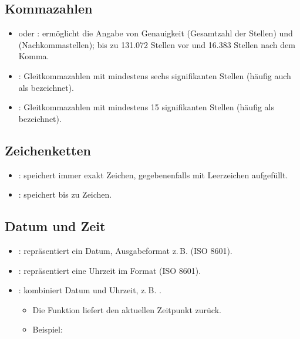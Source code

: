 \subsection{Kommazahlen}
    \begin{itemize}
        \item \textbf{} oder \textbf{}: 
        ermöglicht die Angabe von Genauigkeit  (Gesamtzahl der Stellen) 
        und  (Nachkommastellen); 
        bis zu 131.072 Stellen vor und 16.383 Stellen nach dem Komma.
        \item \textbf{}: Gleitkommazahlen mit mindestens sechs signifikanten Stellen 
        (häufig auch als  bezeichnet).
        \item \textbf{}: Gleitkommazahlen mit mindestens 15 signifikanten Stellen 
        (häufig als  bezeichnet).
    \end{itemize}

    \subsection{Zeichenketten}
    \begin{itemize}
        \item \textbf{}: speichert immer exakt  Zeichen, gegebenenfalls mit Leerzeichen aufgefüllt.
        \item \textbf{}: speichert bis zu  Zeichen.
    \end{itemize}

    \subsection{Datum und Zeit}
    \begin{itemize}
        \item \textbf{}: repräsentiert ein Datum, Ausgabeformat z.\,B.  (ISO 8601).
        \item \textbf{}: repräsentiert eine Uhrzeit im Format  (ISO 8601).
        \item \textbf{}: kombiniert Datum und Uhrzeit, z.\,B. .
        \begin{itemize}
            \item Die Funktion  liefert den aktuellen Zeitpunkt zurück.
            \item Beispiel: 
        \end{itemize}
    \end{itemize}

